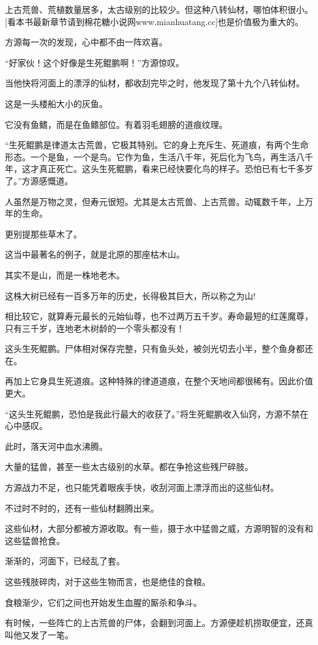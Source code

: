 \begin{this_body}
上古荒兽、荒植数量居多，太古级别的比较少。但这种八转仙材，哪怕体积很小。[看本书最新章节请到棉花糖小说网www.mianhuatang.cc]也是价值极为重大的。

方源每一次的发现，心中都不由一阵欢喜。

“好家伙！这个好像是生死鲲鹏啊！”方源惊叹。

当他快将河面上的漂浮的仙材，都收刮完毕之时，他发现了第十九个八转仙材。

这是一头楼船大小的灰鱼。

它没有鱼鳍，而是在鱼鳍部位。有着羽毛翅膀的道痕纹理。

“生死鲲鹏是律道太古荒兽，它极其特别。它的身上充斥生、死道痕，有两个生命形态。一个是鱼，一个是鸟。它作为鱼，生活八千年，死后化为飞鸟，再生活八千年，这才真正死亡。这头生死鲲鹏，看来已经快要化鸟的样子。恐怕已有七千多岁了。”方源感慨道。

人虽然是万物之灵，但寿元很短。尤其是太古荒兽、上古荒兽。动辄数千年，上万年的生命。

更别提那些草木了。

这当中最著名的例子，就是北原的那座枯木山。

其实不是山，而是一株地老木。

这株大树已经有一百多万年的历史，长得极其巨大，所以称之为山!

相比较它，就算寿元最长的元始仙尊，也不过两万五千岁。寿命最短的红莲魔尊，只有三千岁，连地老木树龄的一个零头都没有！

这头生死鲲鹏。尸体相对保存完整，只有鱼头处，被剑光切去小半，整个鱼身都还在。

再加上它身具生死道痕。这种特殊的律道道痕，在整个天地间都很稀有。因此价值更大。

“这头生死鲲鹏，恐怕是我此行最大的收获了。”将生死鲲鹏收入仙窍，方源不禁在心中感叹。

此时，落天河中血水沸腾。

大量的猛兽，甚至一些太古级别的水草。都在争抢这些残尸碎肢。

方源战力不足，也只能凭着眼疾手快，收刮河面上漂浮而出的这些仙材。

不过时不时的，还有一些仙材翻腾出来。

这些仙材，大部分都被方源收取。有一些，摄于水中猛兽之威，方源明智的没有和这些猛兽抢食。

渐渐的，河面下，已经乱了套。

这些残肢碎肉，对于这些生物而言，也是绝佳的食粮。

食粮渐少，它们之间也开始发生血腥的厮杀和争斗。

有时候，一些阵亡的上古荒兽的尸体，会翻到河面上。方源便趁机捞取便宜，还真叫他又发了一笔。


\end{this_body}
